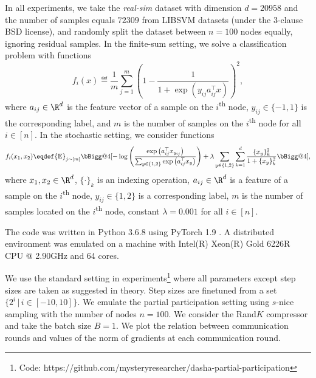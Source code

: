 \documentclass{article}
\makeatletter
\newcommand{\vast}{\bBigg@{4}}
\makeatother
\begin{document}
In all experiments, we take the \textit{real-sim} dataset with dimension $d = \num[group-separator={,}]{20958}$ and the number of samples equals $\num[group-separator={,}]{72309}$ from LIBSVM datasets \citep{chang2011libsvm} (under the 3-clause BSD license), and randomly split the dataset between $n = 100$ nodes equally, ignoring residual samples.
In the finite-sum setting, we solve a classification problem with functions
$$f_i(x) \eqdef \frac{1}{m}\sum_{j=1}^m \left(1 - \frac{1}{1 + \exp(y_{ij} a_{ij}^\top x)}\right)^2,$$
where $a_{ij} \in \R^{d}$ is the feature vector of a sample on the $i$\textsuperscript{th} node, $y_{ij} \in \{-1, 1\}$ is the corresponding label,  and $m$ is the number of samples on the $i$\textsuperscript{th} node for all $i \in [n].$
In the stochastic setting, we consider functions
\begin{align*}f_i(x_1, x_2) \eqdef {\rm E}_{j \sim [m]}\vast[-\log\left(\frac{\exp\left(a_{ij}^\top x_{y_{ij}}\right)}{\sum_{y \in \{1, 2\}} \exp\left(a_{ij}^\top x_{y}\right)}\right) + \lambda \sum_{y \in \{1, 2\}} \sum_{k = 1}^d \frac{\{x_{y}\}_k^2}{1 + \{x_{y}\}_k^2}\vast],\end{align*}
where $x_1, x_2 \in \R^{d}$, $\{\cdot\}_k$ is an indexing operation,
$a_{ij} \in \R^{d}$ is a feature of a sample on the $i$\textsuperscript{th} node, $y_{ij} \in \{1, 2\}$ is a corresponding label, $m$ is the number of samples located on the $i$\textsuperscript{th} node, constant $\lambda = 0.001$ for all $i \in [n].$

The code was written in Python 3.6.8 using PyTorch 1.9 \citep{paszke2019pytorch}. A distributed environment was emulated on a machine with Intel(R) Xeon(R) Gold 6226R CPU @ 2.90GHz and 64 cores.

We use the standard setting in experiments\footnote{Code: https://github.com/mysteryresearcher/dasha-partial-participation} where all parameters except step sizes are taken as suggested in theory. Step sizes are finetuned from a set~$\{2^{i}\,|\,i \in [-10, 10]\}.$ We emulate the partial participation setting using $s$-nice sampling with the number of nodes $n = 100$. We consider the Rand$K$ compressor and take the batch size $B = 1$. 
We plot the relation between communication rounds and values of the norm of gradients at each communication round.
\end{document}
